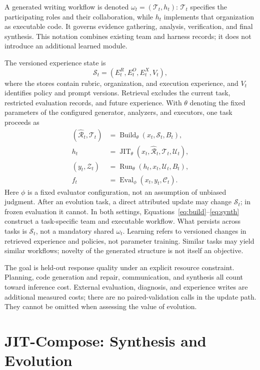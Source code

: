 \documentclass[11pt]{article}
\newcommand{\state}{\mathcal{S}}
\newcommand{\rub}{\widehat{\mathcal{R}}}
\newcommand{\crit}{\mathcal{C}}
\newcommand{\team}{\mathcal{T}}
\newcommand{\trace}{\mathcal{Z}}
\begin{document}
A generated writing workflow is denoted $\omega_t=(\team_t,h_t)$: $\team_t$ specifies the participating roles and their collaboration, while $h_t$ implements that organization as executable code. It governs evidence gathering, analysis, verification, and final synthesis. This notation combines existing team and harness records; it does not introduce an additional learned module.

The versioned experience state is
\begin{equation}
\state_t=(E_t^R,E_t^O,E_t^X,V_t),
\end{equation}
where the stores contain rubric, organization, and execution experience, and $V_t$ identifies policy and prompt versions. Retrieval excludes the current task, restricted evaluation records, and future experience. With $\theta$ denoting the fixed parameters of the configured generator, analyzers, and executors, one task proceeds as
\begin{align}
(\rub_t,\team_t)&=\operatorname{Build}_{\theta}(x_t,\state_t,B_t),\label{eq:build}\\
h_t&=\operatorname{JIT}_{\theta}(x_t,\rub_t,\team_t,\mathcal U_t),\label{eq:synth}\\
(y_t,\trace_t)&=\operatorname{Run}_{\theta}(h_t,x_t,\mathcal U_t,B_t),\label{eq:run}\\
f_t&=\operatorname{Eval}_{\phi}(x_t,y_t,\crit_t).\label{eq:eval}
\end{align}
Here $\phi$ is a fixed evaluator configuration, not an assumption of unbiased judgment. After an evolution task, a direct attributed update may change $\state_t$; in frozen evaluation it cannot. In both settings, Equations~\ref{eq:build}--\ref{eq:synth} construct a task-specific team and executable workflow. What persists across tasks is $\state_t$, not a mandatory shared $\omega_t$. Learning refers to versioned changes in retrieved experience and policies, not parameter training. Similar tasks may yield similar workflows; novelty of the generated structure is not itself an objective.

The goal is held-out response quality under an explicit resource constraint. Planning, code generation and repair, communication, and synthesis all count toward inference cost. External evaluation, diagnosis, and experience writes are additional measured costs; there are no paired-validation calls in the update path. They cannot be omitted when assessing the value of evolution.

\section{JIT-Compose: Synthesis and Evolution}
\label{sec:method}
\end{document}
